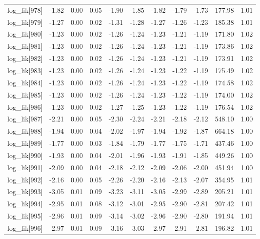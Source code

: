 \begin{table}[ht]
\begin{tabular}{rrrrrrrrrrr}
  log\_lik[978] & -1.82 & 0.00 & 0.05 & -1.90 & -1.85 & -1.82 & -1.79 & -1.73 & 177.98 & 1.01 \\ 
  log\_lik[979] & -1.27 & 0.00 & 0.02 & -1.31 & -1.28 & -1.27 & -1.26 & -1.23 & 185.38 & 1.01 \\ 
  log\_lik[980] & -1.23 & 0.00 & 0.02 & -1.26 & -1.24 & -1.23 & -1.21 & -1.19 & 171.80 & 1.02 \\ 
  log\_lik[981] & -1.23 & 0.00 & 0.02 & -1.26 & -1.24 & -1.23 & -1.21 & -1.19 & 173.86 & 1.02 \\ 
  log\_lik[982] & -1.23 & 0.00 & 0.02 & -1.26 & -1.24 & -1.23 & -1.21 & -1.19 & 173.91 & 1.02 \\ 
  log\_lik[983] & -1.23 & 0.00 & 0.02 & -1.26 & -1.24 & -1.23 & -1.22 & -1.19 & 175.49 & 1.02 \\ 
  log\_lik[984] & -1.23 & 0.00 & 0.02 & -1.26 & -1.24 & -1.23 & -1.22 & -1.19 & 174.58 & 1.02 \\ 
  log\_lik[985] & -1.23 & 0.00 & 0.02 & -1.26 & -1.24 & -1.23 & -1.22 & -1.19 & 174.00 & 1.02 \\ 
  log\_lik[986] & -1.23 & 0.00 & 0.02 & -1.27 & -1.25 & -1.23 & -1.22 & -1.19 & 176.54 & 1.02 \\ 
  log\_lik[987] & -2.21 & 0.00 & 0.05 & -2.30 & -2.24 & -2.21 & -2.18 & -2.12 & 548.10 & 1.00 \\ 
  log\_lik[988] & -1.94 & 0.00 & 0.04 & -2.02 & -1.97 & -1.94 & -1.92 & -1.87 & 664.18 & 1.00 \\ 
  log\_lik[989] & -1.77 & 0.00 & 0.03 & -1.84 & -1.79 & -1.77 & -1.75 & -1.71 & 437.46 & 1.00 \\ 
  log\_lik[990] & -1.93 & 0.00 & 0.04 & -2.01 & -1.96 & -1.93 & -1.91 & -1.85 & 449.26 & 1.00 \\ 
  log\_lik[991] & -2.09 & 0.00 & 0.04 & -2.18 & -2.12 & -2.09 & -2.06 & -2.00 & 451.94 & 1.00 \\ 
  log\_lik[992] & -2.16 & 0.00 & 0.05 & -2.26 & -2.20 & -2.16 & -2.13 & -2.07 & 354.95 & 1.01 \\ 
  log\_lik[993] & -3.05 & 0.01 & 0.09 & -3.23 & -3.11 & -3.05 & -2.99 & -2.89 & 205.21 & 1.01 \\ 
  log\_lik[994] & -2.95 & 0.01 & 0.08 & -3.12 & -3.01 & -2.95 & -2.90 & -2.81 & 207.42 & 1.01 \\ 
  log\_lik[995] & -2.96 & 0.01 & 0.09 & -3.14 & -3.02 & -2.96 & -2.90 & -2.80 & 191.94 & 1.01 \\ 
  log\_lik[996] & -2.97 & 0.01 & 0.09 & -3.16 & -3.03 & -2.97 & -2.91 & -2.81 & 196.82 & 1.01 \\ 

\end{tabular}
\end{table}
